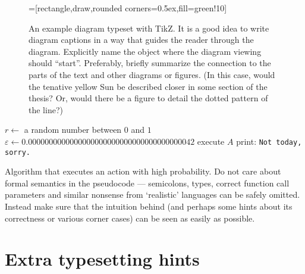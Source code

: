 \begin{figure}
\centering
{}=[rectangle,draw,rounded corners=0.5ex,fill=green!10]
\caption{An example diagram typeset with TikZ. It is a good idea to write diagram captions in a way that guides the reader through the diagram. Explicitly name the object where the diagram viewing should ``start''. Preferably, briefly summarize the connection to the parts of the text and other diagrams or figures. (In this case, would the tenative yellow Sun be described closer in some section of the thesis? Or, would there be a figure to detail the dotted pattern of the line?)}
\label{fig:schema}
\end{figure}

\begin{algorithm}
\begin{algorithmic}
	\State $r \gets$ a random number between $0$ and $1$
	\State $\varepsilon \gets 0.0000000000000000000000000000000000000042$
		\State execute $A$ 
	\Else
		\State print: \texttt{Not today, sorry.}
	\EndIf
\EndFunction
\end{algorithmic}
\caption{Algorithm that executes an action with high probability. Do not care about formal semantics in the pseudocode --- semicolons, types, correct function call parameters and similar nonsense from `realistic' languages can be safely omitted. Instead make sure that the intuition behind (and perhaps some hints about its correctness or various corner cases) can be seen as easily as possible.}
\label{alg:w}
\end{algorithm}

\section{Extra typesetting hints}

